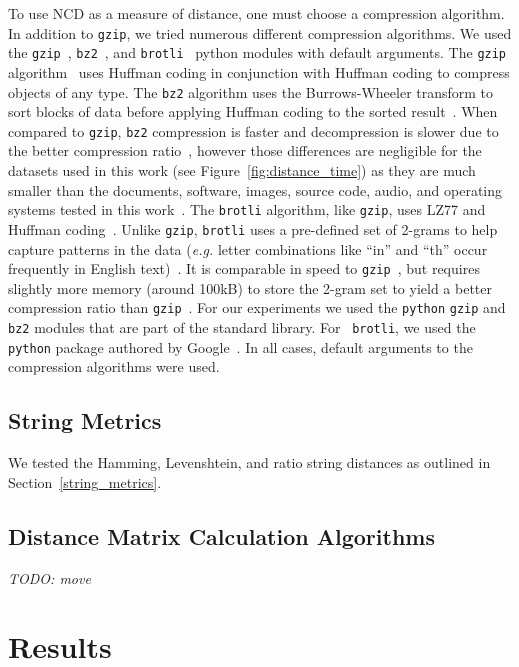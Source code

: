 \documentclass[preprint,12pt]{elsarticle}
\newcommand{\cm}[1]{\textit{{\color{blue}#1}}}
\begin{document}
To use NCD as a measure of distance, one must choose a compression algorithm.
In addition to \texttt{gzip}, we tried numerous different compression algorithms. We used the \texttt{gzip}~\cite{gzip},  \texttt{bz2}~\cite{bz2}, and \texttt{brotli}~\cite{brotli_package} python modules with default arguments.
The \texttt{gzip} algorithm~\cite{deflate,gzip} uses Huffman coding in conjunction with Huffman coding to compress objects of any type. 
The \texttt{bz2} algorithm uses the Burrows-Wheeler transform to sort blocks of data before applying Huffman coding to the sorted result~\cite{bz2}. 
When compared to \texttt{gzip}, \texttt{bz2} compression is faster and decompression is slower due to the better compression ratio~\cite{bz2_comparison}, however those differences are negligible for the datasets used in this work (see Figure~\ref{fig:distance_time}) as they are much smaller than the documents, software, images, source code, audio, and operating systems tested in this work~\cite{bz2_comparison}. 
The \texttt{brotli} algorithm, like \texttt{gzip}, uses LZ77 and Huffman coding~\cite{brotli_comparison}. 
Unlike \texttt{gzip}, \texttt{brotli} uses a pre-defined set of 2-grams to help capture patterns in the data (\textit{e.g.} letter combinations like ``in'' and ``th'' occur frequently in English text)~\cite{brotli_comparison}. 
It is comparable in speed to \texttt{gzip}~\cite{brotli_comparison}, but requires slightly more memory (around 100kB) to store the 2-gram set to yield a better compression ratio than \texttt{gzip}~\cite{brotli_comparison}. 
For our experiments we used the \texttt{python} \texttt{gzip} and  \texttt{bz2} modules that are part of the standard library. 
For ~\texttt{brotli}, we used the \texttt{python} package authored by Google~\cite{brotli_package}. 
In all cases, default arguments to the compression algorithms were used. 


\subsection{String Metrics}
We tested the Hamming, Levenshtein, and ratio string distances as outlined in Section~\ref{string_metrics}.

\subsection{Distance Matrix Calculation Algorithms}
\cm{TODO: move}



\section{Results}
\label{results}
\end{document}
